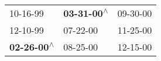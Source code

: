 \begin{supertabular}{lll}
                  10-16-99\textsuperscript{} &  \textbf{03-31-00\textsuperscript{$\wedge$}} &  09-30-00\textsuperscript{} \\
                  12-10-99\textsuperscript{} &                   07-22-00\textsuperscript{} &  11-25-00\textsuperscript{} \\
 \textbf{02-26-00\textsuperscript{$\wedge$}} &                   08-25-00\textsuperscript{} &  12-15-00\textsuperscript{} \\
\end{supertabular}
